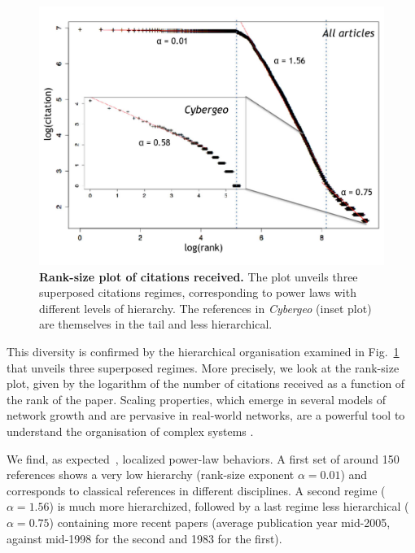 \documentclass[10pt]{article}
\begin{document}
\begin{figure}
\centering
\includegraphics[width=\linewidth]{Fig3.jpg}
\caption{\textbf{Rank-size plot of citations received.} The plot unveils three superposed citations regimes, corresponding to power laws with different levels of hierarchy. The references in \textit{Cybergeo} (inset plot) are themselves in the tail and less hierarchical.}
\label{fig:ranksize}
\end{figure}


This diversity is confirmed by the hierarchical organisation examined in Fig.~\ref{fig:ranksize} that unveils three superposed regimes. More precisely, we look at the rank-size plot, given by the logarithm of the number of citations received as a function of the rank of the paper. Scaling properties, which emerge in several models of network growth and are pervasive in real-world networks, are a powerful tool to understand the organisation of complex systems \citep{Barabasi509}.

We find, as expected~\citep{redner1998popular}, localized power-law behaviors. A first set of around 150 references shows a very low hierarchy (rank-size exponent $\alpha = 0.01$) and corresponds to classical references in different disciplines. A second regime ($\alpha = 1.56$) is much more hierarchized, followed by a last regime less hierarchical ($\alpha = 0.75$) containing more recent papers (average publication year mid-2005, against mid-1998 for the second and 1983 for the first).
\end{document}

